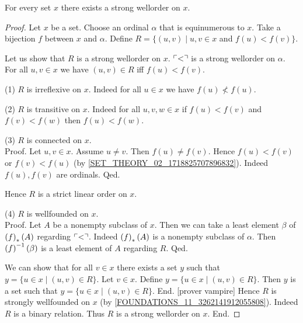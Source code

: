 \documentclass[../set-theory.tex]{subfiles}
\begin{document}
  \begin{forthel}
    \begin{corollary}
      For every set $x$ there exists a strong wellorder on $x$.
    \end{corollary}
    \begin{proof}
      Let $x$ be a set.
      Choose an ordinal $\alpha$ that is equinumerous to $x$.
      Take a bijection $f$ between $x$ and $\alpha$.
      Define $R = \{ (u,v) \mid u, v \in x$ and $f(u) \less f(v) \}$.

      Let us show that $R$ is a strong wellorder on $x$.
        $\ulcorner<\urcorner$ is a strong wellorder on $\alpha$.
        For all $u, v \in x$ we have $(u, v) \in R$ iff $f(u) \less f(v)$.

        (1) $R$ is irreflexive on $x$.
        Indeed for all $u \in x$ we have $f(u) \nless f(u)$.

        (2) $R$ is transitive on $x$.
        Indeed for all $u, v, w \in x$ if $f(u) \less f(v)$ and $f(v) \less f(w)$ then
        $f(u) \less f(w)$.

        (3) $R$ is connected on $x$. \\
        Proof.
          Let $u, v \in x$.
          Assume $u \neq v$.
          Then $f(u) \neq f(v)$.
          Hence $f(u) \less f(v)$ or $f(v) \less f(u)$ (by
          \cref{SET_THEORY_02_1718825707896832}).
          Indeed $f(u), f(v)$ are ordinals.
        Qed.

        Hence $R$ is a strict linear order on $x$.

        (4) $R$ is wellfounded on $x$. \\
        Proof.
          Let $A$ be a nonempty subclass of $x$.
          Then we can take a least element $\beta$ of $\left(f\right)_{*}(A)$ regarding
          $\ulcorner<\urcorner$.
          Indeed $\left(f\right)_{*}(A)$ is a nonempty subclass of $\alpha$.
          Then $\left(f\right)^{-1}(\beta)$ is a least element of $A$ regarding $R$.
        Qed.

        We can show that for all $v \in x$ there exists a set $y$ such that
        $y = \{ u \in x \mid (u,v) \in R \}$.
          Let $v \in x$.
          Define $y = \{ u \in x \mid (u,v) \in R \}$.
          Then $y$ is a set such that $y = \{ u \in x \mid (u,v) \in R \}$.
        End.
        [prover vampire]
        Hence $R$ is strongly wellfounded on $x$ (by
        \cref{FOUNDATIONS_11_3262141912055808}).
        Indeed $R$ is a binary relation.
        Thus $R$ is a strong wellorder on $x$.
      End.
    \end{proof}
  \end{forthel}
\end{document}
